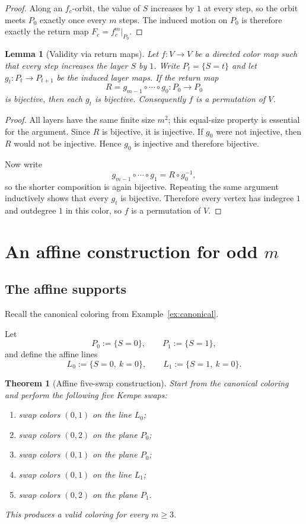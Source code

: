 \documentclass[11pt]{article}
\newtheorem{theorem}{Theorem}
\newtheorem{lemma}{Lemma}
\begin{document}
\begin{proof}
Along an $f_c$-orbit, the value of $S$ increases by $1$ at every step, so the orbit meets $P_0$ exactly once every $m$ steps.
The induced motion on $P_0$ is therefore exactly the return map $F_c=f_c^m|_{P_0}$.
\end{proof}


\begin{lemma}[Validity via return maps]\label{lem:return-validity}
Let $f:V\to V$ be a directed color map such that every step increases the layer $S$ by $1$.
Write $P_t=\{S=t\}$ and let $g_t:P_t\to P_{t+1}$ be the induced layer maps.
If the return map
\[
R=g_{m-1}\circ\cdots\circ g_0:P_0\to P_0
\]
is bijective, then each $g_t$ is bijective.
Consequently $f$ is a permutation of $V$.
\end{lemma}

\begin{proof}
All layers have the same finite size $m^2$; this equal-size property is essential for the argument.
Since $R$ is bijective, it is injective.
If $g_0$ were not injective, then $R$ would not be injective.
Hence $g_0$ is injective and therefore bijective.

Now write
\[
g_{m-1}\circ\cdots\circ g_1 = R\circ g_0^{-1},
\]
so the shorter composition is again bijective.
Repeating the same argument inductively shows that every $g_t$ is bijective.
Therefore every vertex has indegree $1$ and outdegree $1$ in this color, so $f$ is a permutation of $V$.
\end{proof}


\section{An affine construction for odd $m$}\label{sec:affine}

\subsection{The affine supports}
Recall the canonical coloring from Example~\ref{ex:canonical}.

Let
\[
P_0:=\{S=0\},\qquad P_1:=\{S=1\},
\]
and define the affine lines
\[
L_0:=\{S=0,\ k=0\},\qquad L_1:=\{S=1,\ k=0\}.
\]

\begin{theorem}[Affine five-swap construction]\label{thm:5swap}
Start from the canonical coloring and perform the following five Kempe swaps:
\begin{enumerate}[leftmargin=2.2em]
\item swap colors $(0,1)$ on the line $L_0$;
\item swap colors $(0,2)$ on the plane $P_0$;
\item swap colors $(0,1)$ on the plane $P_0$;
\item swap colors $(0,1)$ on the line $L_1$;
\item swap colors $(0,2)$ on the plane $P_1$.
\end{enumerate}
This produces a valid coloring for every $m\ge 3$.
\end{theorem}
\end{document}
